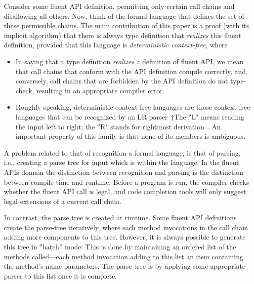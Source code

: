 Consider some fluent API definition, permitting only certain call
chains and disallowing all others.
Now, think of the formal language that defines the set of these permissible chains.
The main contribution of this paper is a proof (with its implicit algorithm) that
there is always \Java type definition that \emph{realizes} this fluent definition, provided that this
language is \emph{deterministic context-free}, where
\begin{itemize}
  \item In saying that a type definition \emph{realizes} a definition of fluent
    API, we mean that call chains that conform with the API definition compile
    correctly, and, conversely, call chains that are forbidden by the API
    definition do not type-check, resulting in an appropriate compiler error.
  \item Roughly speaking, deterministic context free languages are those
    context free languages that can be recognized by an LR parser~†{The ‟L"
    means reading the input left to right; the ‟R" stands for rightmost derivation}~\cite{Aho:86}.
    An important property of this family is that none of its members is ambiguous.
\end{itemize}

A problem related to that of recognition a formal language,
  is that of parsing, i.e., creating a parse tree for input which is within the language.
In the fluent APIs domain the distinction between recognition and parsing is
  the distinction between compile time and runtime.
Before a program is run, the compiler checks whether the fluent API call is legal,
  and code completion tools will only suggest legal extensions of a current call chain.

In contrast, the parse tree is created at runtime.
Some fluent API definitions create the parse-tree
  iteratively, where each method invocations in the call chain adding
  more components to this tree.
However, it is always possible to generate this tree in ‟batch” mode:
This is done by maintaining an ordered list of the methods
  called---each method invocation adding to this list an item containing the method's name
  parameters.
The parse tree is by applying some appropriate parser to this list
  once it is complete.

